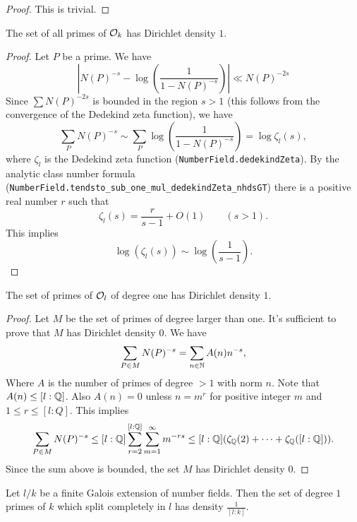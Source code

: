 \begin{proof}
	This is trivial.
\end{proof}

\begin{lemma} \label{lem:Dirichlet density top}
	The set of all primes of ${\mathcal O}_k$ has Dirichlet density $1$.
\end{lemma}

\begin{proof}
	Let $P$ be a prime. We have
	\[
		\left|N(P)^{-s} - \log\left( \frac{1}{1-N(P)^{-s}}\right)\right| \ll N(P)^{-2s}
	\]
	Since $\sum N(P)^{-2s}$ is bounded in the region $s > 1$ (this follows from the convergence of the
	Dedekind zeta function), we have
	\[
		\sum_P N(P)^{-s}
		\sim
		\sum_P \log\left( \frac{1}{1-N(P)^{-s}} \right)
		=
		\log \zeta_l(s),
	\]
	where $\zeta_l$ is the Dedekind zeta function (\texttt{NumberField.dedekindZeta}).
	By the analytic class number formula (\verb!NumberField.tendsto_sub_one_mul_dedekindZeta_nhdsGT!)
	there is a positive real number $r$ such that
	\[
		\zeta_l(s) = \frac{r}{s-1} + O(1) \qquad (s > 1).
	\]
	This implies
	\[
		\log(\zeta_l(s)) \sim \log\left( \frac{1}{s-1}\right).
	\]
\end{proof}



\begin{lemma} \label{lem:Dirichlet density degree one}
	The set of primes of ${\mathcal O}_l$ of degree one has Dirichlet density $1$.
\end{lemma}

\begin{proof}
	Let $M$ be the set of primes of degree larger than one. It's sufficient to
	prove that $M$ has Dirichlet density $0$.
	We have
	\[
		\sum_{P \in M} N(P)^{-s}
		= \sum_{n \in {\mathbb N}} A(n) n^{-s},
	\]
	Where $A$ is the number of primes of degree $>1$ with norm $n$.
	Note that $A(n) \le [l:{\mathbb Q}]$. Also $A(n)=0$ unless $n=m^r$ for positive integer $m$ and
	$1 \le r \le [l:Q]$.
	This implies
	\[
		\sum_{P \in M} N(P)^{-s}
		\le [l:{\mathbb Q}] \sum_{r=2}^{[l:{\mathbb Q}]} \sum_{m =1} ^\infty m^{-rs}
		\le [l:{\mathbb Q}] (\zeta_{\mathbb Q}(2) + \cdots + \zeta_{\mathbb Q}([l:{\mathbb Q}]) ).
	\]
	Since the sum above is bounded, the set $M$ has Dirichlet density $0$.
\end{proof}


\begin{lemma} \label{lem:Dirichlet density split}
	Let $l/k$ be a finite Galois extension of number fields.
	Then the set of degree $1$ primes of $k$ which split completely in $l$
	has density $\frac{1}{[l:k]}$.
\end{lemma}

